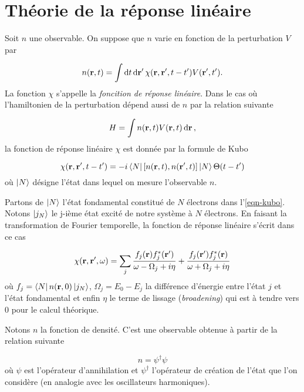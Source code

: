 \chapter{Théorie de la réponse linéaire}\label{chap-TRL}
Soit $n$ une observable. On suppose que $n$ varie en fonction de la perturbation $V$ par

\begin{equation*}
  n(\vb{r}, t) = \int \dd{t} \dd{\vb{r}'}  \chi (\vb{r}, \vb{r}', t-t') V(\vb{r}', t').
\end{equation*}
La fonction $\chi$ s'appelle la \textit{foncition de réponse linéaire}.
Dans le cas où l'hamiltonien de la perturbation dépend aussi de $n$ par la relation suivante

\begin{equation*}
  H = \int n(\vb{r}, t) V(\vb{r}, t) \dd{\vb{r}},
\end{equation*}
la fonction de réponse linéaire $\chi$ est donnée par la formule de Kubo~\cite{Abrikosov1963}

\begin{equation}\label{eqn-kubo}
  \chi (\vb{r}, \vb{r}', t-t') = -i \bra{N} \comm{n(\vb{r}, t)}{n(\vb{r}', t)} \ket{N} \Theta(t-t')
\end{equation}
où $\ket{N}$ désigne l'état dans lequel on mesure l'observable $n$.

Partons de $\ket{N}$ l'état fondamental constitué de $N$ électrons dans l'\cref{eqn-kubo}.
Notons $\ket{j_N}$ le j-ième état excité de notre système à $N$ électrons.
En faisant la transformation de Fourier temporelle,
la fonction de réponse linéaire s'écrit dans ce cas

\begin{equation}\label{eqn-chi-appendix}
 \chi (\vb{r}, \vb{r}', \omega) = \sum_j \frac{f_j(\vb{r}) f_j^*(\vb{r}') }{\omega - \Omega_j + i \eta} + \frac{f_j(\vb{r}') f_j^*(\vb{r}) }{\omega + \Omega_j + i \eta}
\end{equation}
où $f_j = \bra{N}n(\vb{r}, 0)\ket{j_N}$, $\Omega_j = E_0 - E_j$ la différence d'énergie
entre l'état $j$ et l'état fondamental et enfin $\eta$ le terme de lissage (\textit{broadening})
qui est à tendre vers 0 pour le calcul théorique.

Notons $n$ la fonction de densité. C'est une observable obtenue à partir de la relation suivante

\begin{equation*}
n = \psi^\dagger \psi
\end{equation*}
où $\psi$ est l'opérateur d'annihilation et $\psi^\dagger$ l'opérateur de création de l'état
que l'on considère (en analogie avec les oscillateurs harmoniques).

